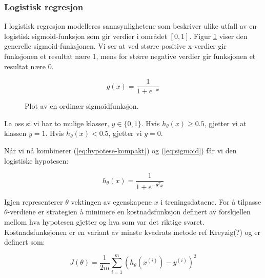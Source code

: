 \subsubsection*{Logistisk regresjon}
I logistisk regresjon modelleres sannsynlighetene som beskriver ulike utfall av en logistisk sigmoid-funksjon som gir verdier i området \([0,1]\). Figur \ref{figure:sigmoid} viser den generelle sigmoid-funksjonen. Vi ser at ved større positive x-verdier gir funksjonen et resultat nære 1, mens for større negative verdier gir funksjonen et resultat nære 0.

\begin{equation}
g(x) = \frac{1}{1 + e^{-x}}
\label{eq:sigmoid}
\end{equation}

\begin{figure}[h!]
\centering
{}
\caption{Plot av en ordinær sigmoidfunksjon.}
\label{figure:sigmoid}
\end{figure}

La oss si vi har to mulige klasser, \(y \in \{0,1\}\). Hvis \( h_\theta(x) \geq  0.5\), gjetter vi at klassen \(y = 1\). Hvis \( h_\theta(x) < 0.5\), gjetter vi \(y = 0\).

Når vi nå kombinerer (\ref{eq:hypotese-kompakt}) og (\ref{eq:sigmoid}) får vi den logistiske hypotesen:

\begin{equation}
h_\theta(x) = \frac{1}{1 + e^{-\theta^{T}x}}
\label{eq:logistic}
\end{equation}

Igjen representerer $\theta$ vektingen av egenskapene $x$ i treningsdataene. For å tilpasse $\theta$-verdiene er strategien å minimere en kostnadsfunksjon definert av forskjellen mellom hva hypotesen gjetter og hva som var det riktige svaret. Kostnadsfunksjonen er en variant av minste kvadrats metode {\color{red}ref Kreyzig(?)} og er definert som: 

\begin{equation}
J(\theta) = 
    \frac{1}{2m} \sum_{i=1}^{m} (h_\theta(x^{(i)})-y^{(i)})^2
\label{eq:minimize}
\end{equation}

